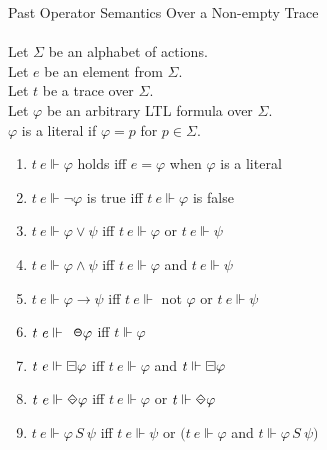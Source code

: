 \begin{definition}Past Operator Semantics Over a Non-empty Trace\\
\label{def:PastNon-emptyTraceSemantics}
\\
Let $\Sigma$ be an alphabet of actions.\\
Let $e$ be an element from $\Sigma$.\\
Let $t$ be a trace over $\Sigma$.\\
Let $\varphi$ be an arbitrary LTL formula over $\Sigma$.\\
$\varphi$ is a literal if $\varphi = p$ for $p \in \Sigma$.

\begin{enumerate}[start = 28]
\item $t\ e  \Vdash \varphi$ holds iff $e = \varphi $ when $\varphi$ is a literal
\item $t\ e  \Vdash \neg\varphi$ is true iff $t\ e \Vdash \varphi$ is false
\item $t\ e  \Vdash \varphi \lor \psi$ iff $t\ e \Vdash \varphi$ or $t\ e \Vdash \psi$
\item $t\ e  \Vdash \varphi \land \psi$ iff $t\ e \Vdash \varphi$ and $t\ e \Vdash \psi$
\item $t\ e  \Vdash \varphi \rightarrow \psi$ iff $t\ e \Vdash $ not $\varphi$ or $t\ e \Vdash \psi$
\item $t\ e  \Vdash \LTLprevious\varphi$ iff $t \Vdash \varphi$
\item $t\ e  \Vdash \LTLalwaysbeen\varphi$ iff $t\ e \Vdash \varphi$ and $t \Vdash \LTLalwaysbeen\varphi$
\item $t\ e  \Vdash \LTLonce\varphi$ iff $t\ e \Vdash \varphi$ or $t \Vdash \LTLonce\varphi$
\item $t\ e  \Vdash \varphi \,S\ \psi$ iff $t\ e \Vdash \psi$ or $(t\ e \Vdash \varphi$ and $t \Vdash \varphi \,S\ \psi)$
\end{enumerate}
\end{definition}